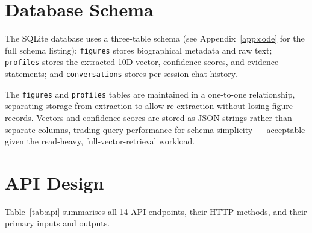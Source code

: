 \documentclass[11pt, a4paper]{report}
\begin{document}
\section{Database Schema}

The SQLite database uses a three-table schema (see Appendix~\ref{app:code} for the full schema listing): \texttt{figures} stores biographical metadata and raw text; \texttt{profiles} stores the extracted 10D vector, confidence scores, and evidence statements; and \texttt{conversations} stores per-session chat history.

The \texttt{figures} and \texttt{profiles} tables are maintained in a one-to-one relationship, separating storage from extraction to allow re-extraction without losing figure records. Vectors and confidence scores are stored as JSON strings rather than separate columns, trading query performance for schema simplicity — acceptable given the read-heavy, full-vector-retrieval workload.

\section{API Design}

Table~\ref{tab:api} summarises all 14 API endpoints, their HTTP methods, and their primary inputs and outputs.
\end{document}
